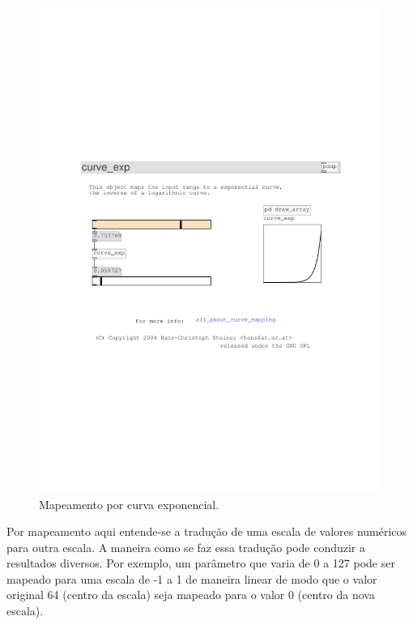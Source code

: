 \documentclass[draft]{ppgmus}
\begin{document}
\begin{figure}
\includegraphics[scale=.6]{mapping2}
\caption{Mapeamento por curva exponencial.}
\label{mapping2}
\end{figure}

Por mapeamento aqui entende-se a tradução de uma escala
de valores numéricos para outra escala. A maneira como
se faz essa tradução pode conduzir a resultados diversos.
Por exemplo, um parâmetro que varia de 0 a 127 pode ser 
mapeado para uma escala de -1 a 1 de maneira linear de modo
que o valor original 64 (centro da escala) seja mapeado para o valor 0 (centro
da nova escala).
\end{document}
